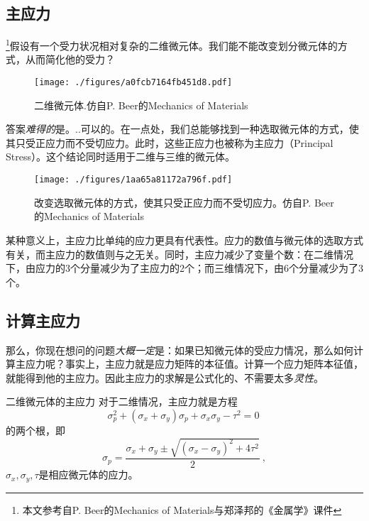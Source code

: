 

\subsection{主应力}
\footnote{本文参考自P. Beer的Mechanics of Materials与郑泽邦的《金属学》课件}假设有一个受力状况相对复杂的二维微元体。我们能不能改变划分微元体的方式，从而简化他的受力？
\begin{figure}[ht]
\centering
\texttt{[image: ./figures/a0fcb7164fb451d8.pdf]}
\caption{二维微元体.仿自P. Beer的Mechanics of Materials} \label{fig_PRSTR_1}
\end{figure}

答案\textsl{难得的}是。..可以的。在一点处，我们总能够找到一种选取微元体的方式，使其只受正应力而不受切应力。此时，这些正应力也被称为主应力（Principal Stress）。这个结论同时适用于二维与三维的微元体。
\begin{figure}[ht]
\centering
\texttt{[image: ./figures/1aa65a81172a796f.pdf]}
\caption{改变选取微元体的方式，使其只受正应力而不受切应力。仿自P. Beer的Mechanics of Materials} \label{fig_PRSTR_2}
\end{figure}

某种意义上，主应力比单纯的应力更具有代表性。应力的数值与微元体的选取方式有关，而主应力的数值则与之无关。同时，主应力减少了变量个数：在二维情况下，由应力的3个分量减少为了主应力的2个；而三维情况下，由6个分量减少为了3个。

\subsection{计算主应力}

那么，你现在想问的问题\textsl{大概一定}是：如果已知微元体的受应力情况，那么如何计算主应力呢？事实上，主应力就是应力矩阵的本征值。计算一个应力矩阵本征值，就能得到他的主应力。因此主应力的求解是公式化的、不需要太多\textsl{灵性}。

\begin{example}{二维微元体的主应力}
对于二维情况，主应力就是方程
$$\sigma_p^2+(\sigma_x+\sigma_y)\sigma_p+\sigma_x\sigma_y-\tau^2=0~$$
的两个根，即
$$\sigma_p=\frac{\sigma_x+\sigma_y \pm \sqrt{(\sigma_x-\sigma_y)^2+4\tau^2}}{2}~,$$
$\sigma_x,\sigma_y,\tau$是相应微元体的应力。
\end{example}

